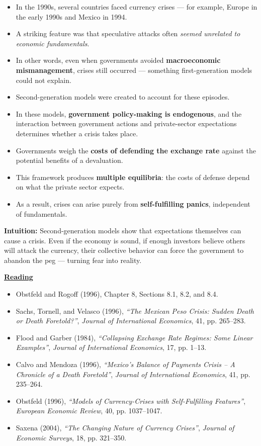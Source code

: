 \documentclass[12pt]{article}
\begin{document}
\begin{itemize}
    \item In the 1990s, several countries faced currency crises — for example, Europe in the early 1990s and Mexico in 1994.  
    \item A striking feature was that speculative attacks often \textit{seemed unrelated to economic fundamentals}.  
    \item In other words, even when governments avoided \textbf{macroeconomic mismanagement}, crises still occurred — something first-generation models could not explain.  
    \item Second-generation models were created to account for these episodes.  
    \item In these models, \textbf{government policy-making is endogenous}, and the interaction between government actions and private-sector expectations determines whether a crisis takes place.  
    \item Governments weigh the \textbf{costs of defending the exchange rate} against the potential benefits of a devaluation.  
    \item This framework produces \textbf{multiple equilibria}: the costs of defense depend on what the private sector expects.  
    \item As a result, crises can arise purely from \textbf{self-fulfilling panics}, independent of fundamentals.  
\end{itemize}

\textbf{Intuition:} Second-generation models show that expectations themselves can cause a crisis. Even if the economy is sound, if enough investors believe others will attack the currency, their collective behavior can force the government to abandon the peg — turning fear into reality.

\vspace{.5cm}
\noindent\underline{\textbf{Reading}} \\[2pt]
\begin{itemize}
    \item Obstfeld and Rogoff (1996), Chapter 8, Sections 8.1, 8.2, and 8.4.  
    \item Sachs, Tornell, and Velasco (1996), \textit{“The Mexican Peso Crisis: Sudden Death or Death Foretold?”}, \textit{Journal of International Economics}, 41, pp. 265–283.  
    \item Flood and Garber (1984), \textit{“Collapsing Exchange Rate Regimes: Some Linear Examples”}, \textit{Journal of International Economics}, 17, pp. 1–13.  
    \item Calvo and Mendoza (1996), \textit{“Mexico’s Balance of Payments Crisis – A Chronicle of a Death Foretold”}, \textit{Journal of International Economics}, 41, pp. 235–264.  
    \item Obstfeld (1996), \textit{“Models of Currency-Crises with Self-Fulfilling Features”}, \textit{European Economic Review}, 40, pp. 1037–1047.  
    \item Saxena (2004), \textit{“The Changing Nature of Currency Crises”}, \textit{Journal of Economic Surveys}, 18, pp. 321–350.  
\end{itemize}
\end{document}
